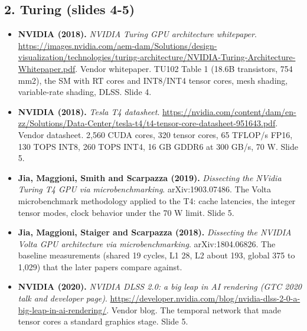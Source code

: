 \documentclass[11pt,letterpaper]{article}
\begin{document}
\subsection*{2. Turing (slides 4-5)}
\begin{itemize}[leftmargin=1.2em,itemsep=3pt]\sloppy
\item \textbf{NVIDIA (2018).} \textit{NVIDIA Turing GPU architecture whitepaper}. \url{https://images.nvidia.com/aem-dam/Solutions/design-visualization/technologies/turing-architecture/NVIDIA-Turing-Architecture-Whitepaper.pdf}. Vendor whitepaper. TU102 Table 1 (18.6B transistors, 754 mm2), the SM with RT cores and INT8/INT4 tensor cores, mesh shading, variable-rate shading, DLSS. Slide 4.
\item \textbf{NVIDIA (2018).} \textit{Tesla T4 datasheet}. \url{https://nvidia.com/content/dam/en-zz/Solutions/Data-Center/tesla-t4/t4-tensor-core-datasheet-951643.pdf}. Vendor datasheet. 2,560 CUDA cores, 320 tensor cores, 65 TFLOP/s FP16, 130 TOPS INT8, 260 TOPS INT4, 16 GB GDDR6 at 300 GB/s, 70 W. Slide 5.
\item \textbf{Jia, Maggioni, Smith and Scarpazza (2019).} \textit{Dissecting the NVidia Turing T4 GPU via microbenchmarking}. arXiv:1903.07486. The Volta microbenchmark methodology applied to the T4: cache latencies, the integer tensor modes, clock behavior under the 70 W limit. Slide 5.
\item \textbf{Jia, Maggioni, Staiger and Scarpazza (2018).} \textit{Dissecting the NVIDIA Volta GPU architecture via microbenchmarking}. arXiv:1804.06826. The baseline measurements (shared 19 cycles, L1 28, L2 about 193, global 375 to 1,029) that the later papers compare against.
\item \textbf{NVIDIA (2020).} \textit{NVIDIA DLSS 2.0: a big leap in AI rendering (GTC 2020 talk and developer page)}. \url{https://developer.nvidia.com/blog/nvidia-dlss-2-0-a-big-leap-in-ai-rendering/}. Vendor blog. The temporal network that made tensor cores a standard graphics stage. Slide 5.
\end{itemize}
\end{document}
